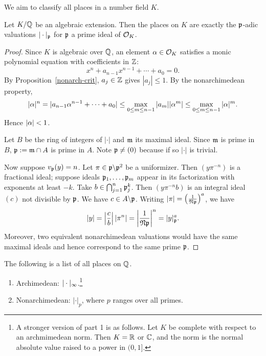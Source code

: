 We aim to classify all places in a number field $K$. %
\begin{pr}
Let $K/\mathbb{Q}$ be an algebraic extension. Then the places on $K$ are exactly the $\mathfrak{p}$-adic valuations $|\cdot|_{\mathfrak{p}}$ for $\mathfrak{p}$ a prime ideal of $\mathcal{O}_K$. %
\end{pr}
\begin{proof}
Since $K$ is algebraic over $\mathbb{Q}$, an element $\alpha\in \mathcal{O}_K$ satisfies a monic polynomial equation with coefficients in $\mathbb{Z}$:
\[
x^n+a_{n-1}x^{n-1}+\cdots +a_0=0.
\]
By Proposition~\ref{nonarch-crit}, $a_j\in \mathbb{Z}$ gives $|a_j|\le 1$.
By the nonarchimedean property,
\[|\alpha|^n=|a_{n-1}\alpha^{n-1}+\cdots +a_0|\le \max_{0\le m\le n-1}|a_{m}||\alpha^{m}|\le \max_{0\le m\le n-1}|\alpha|^m.\]
Hence $|\alpha|<1$.

Let $B$ be the ring of integers of $|\cdot|$ and $\mathfrak{m}$ its maximal ideal. Since $\mathfrak{m}$ is prime in $B$, $\mathfrak{p}:=\mathfrak{m}\cap A$ is prime in $A$. Note $\mathfrak{p}\ne (0)$ because if so $|\cdot|$ is trivial.

Now suppose $v_{\mathfrak{p}}(y)=n$. Let $\pi\in \mathfrak{p}\backslash \mathfrak{p}^2$ be a uniformizer. Then $(y\pi^{-n})$ is a fractional ideal; suppose ideals $\mathfrak{p}_1,\ldots, \mathfrak{p}_m$ appear in its factorization with exponents at least $-k$. Take $b\in \bigcap_{j=1}^n \mathfrak{p}_j^k$. Then $(y\pi^{-n}b)$ is an integral ideal $(c)$ not divisible by $\mathfrak{p}$. We have $c\in A\backslash \mathfrak{p}$. Writing $|\pi|=\left( {\frac{1}{\mathfrak N\mathfrak{p}}} \right)^a$, we have
\[
|y|=\left| {\frac{c}{b}} \right|\left| {\pi^n} \right|=\left| {\frac{1}{\mathfrak N \mathfrak{p}}} \right|^n=|y|_{\mathfrak{p}}^a.
\]
Moreover, two equivalent nonarchimedean valuations would have the same maximal ideals and hence correspond to the same prime $\mathfrak{p}$.
\end{proof}
\begin{thm}[Ostrowski]
The following is a list of all places on $\mathbb{Q}$.
\begin{enumerate}
\item
Archimedean: $|\cdot |_{\infty}$.\footnote{A stronger version of part 1 is as follows. Let $K$ be complete with respect to an archmimedean norm. Then $K=\mathbb{R}$ or $\mathbb{C}$, and the norm is the normal absolute value raised to a power in $(0,1]$.}
\item
Nonarchimedean: $|\cdot|_p$, where $p$ ranges over all primes.
\end{enumerate}
\end{thm}
